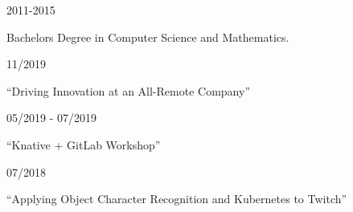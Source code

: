 \documentclass[12pt]{article} %
\begin{document}

\begin{description}
\squish
{}
           {}
           {2011-2015}

Bachelors Degree in Computer Science and Mathematics.
\end{description}


\begin{description}
\squish

           {}
           {11/2019}

    ``Driving Innovation at an All-Remote Company''

           {}
           {05/2019 - 07/2019}

    ``Knative + GitLab Workshop''

           {}
           {07/2018}

    ``Applying Object Character Recognition and Kubernetes to Twitch''

\end{description}
\end{document}
